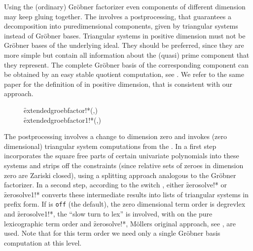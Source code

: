Using the (ordinary) Gr\"obner factorizer even components of different
dimension may keep gluing together. The 
involves a postprocessing, that guarantees a decomposition into
puredimensional components, given by triangular systems instead of Gr\"obner
bases. Triangular systems in positive dimension must not be Gr\"obner bases
of the underlying ideal. They should be preferred, since they are more
simple but contain all information about the (quasi) prime component
that they represent. The complete Gr\"obner basis of the corresponding
component can be obtained by an easy stable quotient computation, see
\cite{Graebe:95b}. We refer to the same paper for the definition of
 in positive dimension, that is consistent
with our approach.
\begin{description}
\item[]
  \begin{syntaxtable}
    \f{extendedgroebfactor!*}(,) \\
    \f{extendedgroebfactor1!*}(,)
  \end{syntaxtable}
  \hypertarget{procedure:EXTENDEDGROEBFACTOR!*}{}
\end{description}
The postprocessing involves a change to dimension zero and invokes
(zero dimensional) triangular system computations from the
. In a first step 
incorporates the square free parts of certain univariate polynomials
into these systems and strips off the constraints (since relative sets
of zeroes in dimension zero are Zariski closed), using a splitting
approach analogous to the Gr\"obner factorizer. In a second step, according
to the switch , either \f{zerosolve!*} or
\f{zerosolve1!*} converts these intermediate results into lists of
triangular systems in prefix form. If  is \texttt{off} (the
default), the zero dimensional term order is degrevlex and
\f{zerosolve1!*}, the ``slow turn to lex'' is involved, with 
on the pure lexicographic term order and \f{zerosolve!*},
M\"ollers original approach, see \cite{Moeller:93}, are used. Note that
for this term order we need only a single Gr\"obner basis computation at
this level.

